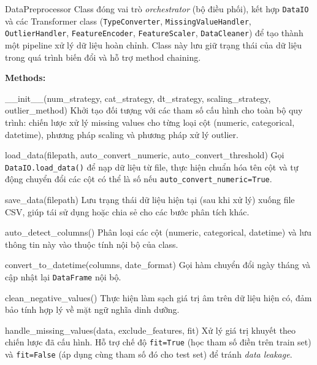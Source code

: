 \documentclass[12pt,a4paper]{article}
\newenvironment{methodlist}{
    \begin{description}[style=nextline, font=\ttfamily\color{sklearn-blue}]
}{
    \end{description}
}
\begin{document}
\begin{classbox}{DataPreprocessor}
Class đóng vai trò \textit{orchestrator} (bộ điều phối), kết hợp \texttt{DataIO} và các Transformer class (\texttt{TypeConverter}, \texttt{MissingValueHandler}, \texttt{OutlierHandler}, \texttt{FeatureEncoder}, \texttt{FeatureScaler}, \texttt{DataCleaner}) để tạo thành một pipeline xử lý dữ liệu hoàn chỉnh. 
Class này lưu giữ trạng thái của dữ liệu trong quá trình biến đổi và hỗ trợ method chaining.

\vspace{0.2cm}
\textbf{Methods:}
\begin{methodlist}
    \item[\_\_init\_\_(num\_strategy, cat\_strategy, dt\_strategy, scaling\_strategy, outlier\_method)] 
    Khởi tạo đối tượng với các tham số cấu hình cho toàn bộ quy trình: chiến lược xử lý missing values cho từng loại cột (numeric, categorical, datetime), phương pháp scaling và phương pháp xử lý outlier.
    
    \item[load\_data(filepath, auto\_convert\_numeric, auto\_convert\_threshold)] 
    Gọi \texttt{DataIO.load\_data()} để nạp dữ liệu từ file, thực hiện chuẩn hóa tên cột và tự động chuyển đổi các cột có thể là số nếu \texttt{auto\_convert\_numeric=True}.
    
    \item[save\_data(filepath)] 
    Lưu trạng thái dữ liệu hiện tại (sau khi xử lý) xuống file CSV, giúp tái sử dụng hoặc chia sẻ cho các bước phân tích khác.
    
    \item[auto\_detect\_columns()] 
    Phân loại các cột (numeric, categorical, datetime) và lưu thông tin này vào thuộc tính nội bộ của class.
    
    \item[convert\_to\_datetime(columns, date\_format)] 
    Gọi hàm chuyển đổi ngày tháng và cập nhật lại \texttt{DataFrame} nội bộ.
    
    \item[clean\_negative\_values()] 
    Thực hiện làm sạch giá trị âm trên dữ liệu hiện có, đảm bảo tính hợp lý về mặt ngữ nghĩa dinh dưỡng.
    
    \item[handle\_missing\_values(data, exclude\_features, fit)] 
    Xử lý giá trị khuyết theo chiến lược đã cấu hình. 
    Hỗ trợ chế độ \texttt{fit=True} (học tham số điền trên train set) và \texttt{fit=False} (áp dụng cùng tham số đó cho test set) để tránh \textit{data leakage}.
    

\end{methodlist}
\end{classbox}
\end{document}
